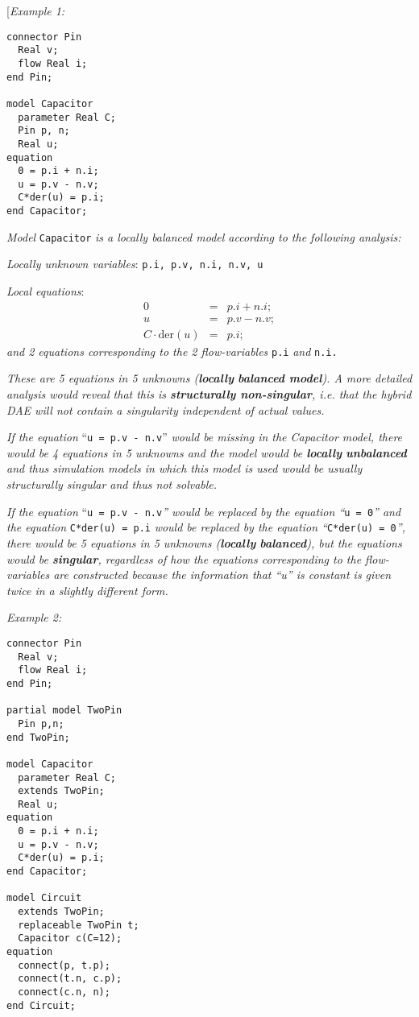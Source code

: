 {[}\emph{Example 1:}
\begin{lstlisting}[language=modelica]
connector Pin
  Real v;
  flow Real i;
end Pin;

model Capacitor
  parameter Real C;
  Pin p, n;
  Real u;
equation
  0 = p.i + n.i;
  u = p.v - n.v;
  C*der(u) = p.i;
end Capacitor;
\end{lstlisting}

\emph{Model} \lstinline!Capacitor! \emph{is a locally balanced model according to
the following analysis:}

\emph{Locally unknown variables}: \lstinline!p.i, p.v, n.i, n.v, u!

\emph{Local equations}:
\begin{eqnarray*}
0 &=& p.i + n.i;\\
u &=& p.v - n.v;\\
C \cdot \text{der}(u) &=& p.i;
\end{eqnarray*}
\emph{and 2 equations corresponding to the 2 flow-variables} \lstinline!p.i!
\emph{and} \lstinline!n.i.!

\emph{These are 5 equations in 5 unknowns (\textbf{locally}
\textbf{balanced model}). A more detailed analysis would reveal that
this is \textbf{structurally non-singular}, i.e. that the hybrid DAE
will not contain a singularity independent of actual values.}

\emph{If the equation} ``\lstinline!u = p.v - n.v!'' \emph{would be missing in the
Capacitor model, there would be 4 equations in 5 unknowns and the model
would be \textbf{locally} \textbf{unbalanced} and thus simulation models
in which this model is used would be usually structurally singular and
thus not solvable.}

\emph{If the equation} ``\lstinline!u = p.v - n.v!\emph{'' would be replaced by the
equation ``}\lstinline!u = 0!\emph{'' and the equation} \lstinline!C*der(u) = p.i! \emph{would
be replaced by the equation ``}\lstinline!C*der(u) = 0!\emph{'', there would be 5
equations in 5 unknowns (\textbf{locally} \textbf{balanced}), but the
equations would be \textbf{singular}, regardless of how the equations
corresponding to the flow-variables are constructed because the
information that ``u'' is constant is given twice in a slightly
different form.}

\emph{Example 2:}

\begin{lstlisting}[language=modelica]
connector Pin
  Real v;
  flow Real i;
end Pin;

partial model TwoPin
  Pin p,n;
end TwoPin;

model Capacitor
  parameter Real C;
  extends TwoPin;
  Real u;
equation
  0 = p.i + n.i;
  u = p.v - n.v;
  C*der(u) = p.i;
end Capacitor;

model Circuit
  extends TwoPin;
  replaceable TwoPin t;
  Capacitor c(C=12);
equation
  connect(p, t.p);
  connect(t.n, c.p);
  connect(c.n, n);
end Circuit;
\end{lstlisting}

